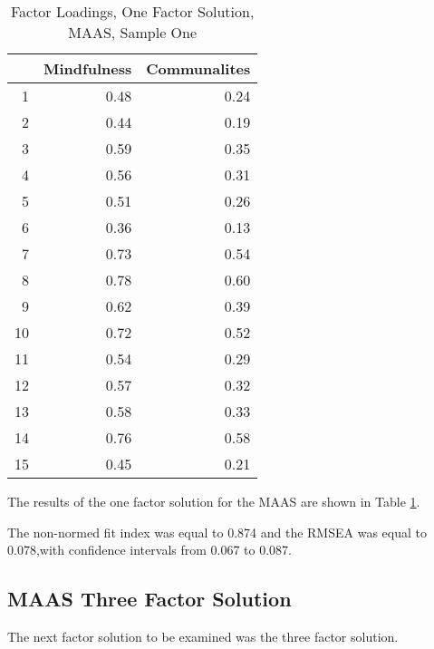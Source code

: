 \documentclass{article}
\begin{document}
\begin{table}[ht]
\centering
\begin{tabular}{rrr}
  \hline
 & Mindfulness & Communalites \\ 
  \hline
1 & 0.48 & 0.24 \\ 
  2 & 0.44 & 0.19 \\ 
  3 & 0.59 & 0.35 \\ 
  4 & 0.56 & 0.31 \\ 
  5 & 0.51 & 0.26 \\ 
  6 & 0.36 & 0.13 \\ 
  7 & 0.73 & 0.54 \\ 
  8 & 0.78 & 0.60 \\ 
  9 & 0.62 & 0.39 \\ 
  10 & 0.72 & 0.52 \\ 
  11 & 0.54 & 0.29 \\ 
  12 & 0.57 & 0.32 \\ 
  13 & 0.58 & 0.33 \\ 
  14 & 0.76 & 0.58 \\ 
  15 & 0.45 & 0.21 \\ 
   \hline
\end{tabular}
\caption{Factor Loadings, One Factor Solution, MAAS, Sample One} 
\label{tab:hom1maas1fact}
\end{table}
The results of the one factor solution for the MAAS are shown in Table \ref{tab:hom1maas1fact}. 

The non-normed fit index was equal to 0.874
and the RMSEA was equal to 0.078,with confidence intervals from 0.067 to 0.087.



\subsection{MAAS Three Factor Solution}
\label{sec:maas-seven-factor}

The next factor solution to be examined was the three factor solution. 
\end{document}
